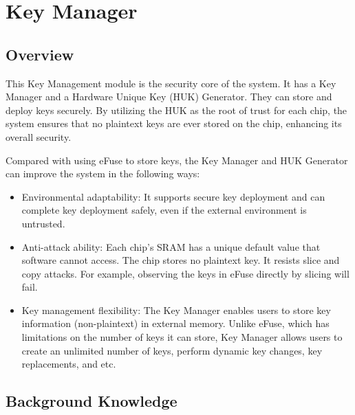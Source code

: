 \documentclass[main\_\_EN.tex]{subfiles}
\begin{document}

\ifglobal
\else
    \listoftodos
    {\let\clearpage\relax \listofdonetodos}
    \tableofcontents
\fi



\hypertarget{keymng}{}
\chapter{Key Manager}
\label{mod:keymng}
\section{Overview}
This Key Management module is the security core of the system. It has a Key Manager and a Hardware Unique Key (HUK) Generator. They can store and deploy keys securely. By utilizing the HUK as the root of trust for each chip, the system ensures that no plaintext keys are ever stored on the chip, enhancing its overall security.

Compared with using eFuse to store keys, the Key Manager and HUK Generator can improve the system in the following ways:
\begin{itemize}
    \item Environmental adaptability: It supports secure key deployment and can complete key deployment safely, even if the external environment is untrusted. 
    \item Anti-attack ability: Each chip's SRAM has a unique default value that software cannot access. The chip stores no plaintext key. It resists slice and copy attacks. For example, observing the keys in eFuse directly by slicing will fail.
    \item Key management flexibility: The Key Manager enables users to store key information (non-plaintext) in external memory. Unlike eFuse, which has limitations on the number of keys it can store, Key Manager allows users to create an unlimited number of keys, perform dynamic key changes, key replacements, and etc.
\end{itemize}

\section{Background Knowledge}
\end{document}
